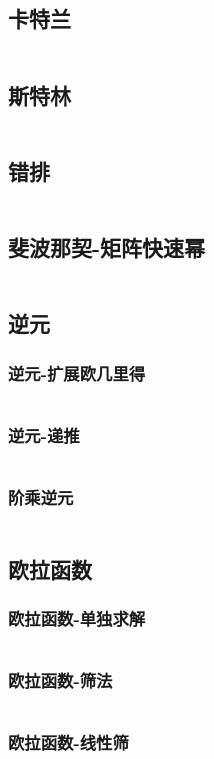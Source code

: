 \documentclass[a4paper,11pt]{article}
\begin{document}
\subsection{卡特兰}
\inputminted[breaklines]{c++}{数论/卡特兰数列.cpp}
\subsection{斯特林}
\inputminted[breaklines]{c++}{数论/斯特林.cpp}
\subsection{错排}
\inputminted[breaklines]{c++}{数论/错排.cpp}
\subsection{斐波那契-矩阵快速幂}
\inputminted[breaklines]{c++}{数论/斐波那契-矩阵快速幂.cpp}
\subsection{逆元}
\subsubsection{逆元-扩展欧几里得}
\inputminted[breaklines]{c++}{数论/逆元-扩展欧几里得.cpp}
\subsubsection{逆元-递推}
\inputminted[breaklines]{c++}{数论/逆元-递推.cpp}
\subsubsection{阶乘逆元}
\inputminted[breaklines]{c++}{数论/阶乘逆元.cpp}
\subsection{欧拉函数}
\subsubsection{欧拉函数-单独求解}
\inputminted[breaklines]{c++}{数论/欧拉函数-单独求解.cpp}
\subsubsection{欧拉函数-筛法}
\inputminted[breaklines]{c++}{数论/欧拉函数-筛法.cpp}
\subsubsection{欧拉函数-线性筛}
\inputminted[breaklines]{c++}{数论/欧拉函数-线性筛.cpp}
\end{document}
